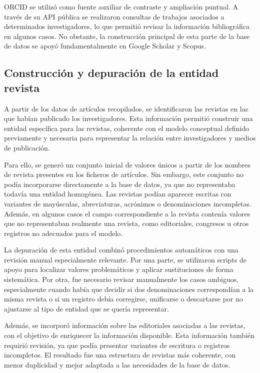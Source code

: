 \documentclass[11pt,spanish,listoffigures,listoftables]{tfgetsinf}
\begin{document}
ORCID se utilizó como fuente auxiliar de contraste y ampliación puntual. A través de su API pública se realizaron consultas de trabajos asociados a determinados investigadores, lo que permitió revisar la información bibliográfica en algunos casos. No obstante, la construcción principal de esta parte de la base de datos se apoyó fundamentalmente en Google Scholar y Scopus.

\subsection{Construcción y depuración de la entidad revista}

A partir de los datos de artículos recopilados, se identificaron las revistas en las que habían publicado los investigadores. Esta información permitió construir una entidad específica para las revistas, coherente con el modelo conceptual definido previamente y necesaria para representar la relación entre investigadores y medios de publicación.

Para ello, se generó un conjunto inicial de valores únicos a partir de los nombres de revista presentes en los ficheros de artículos. Sin embargo, este conjunto no podía incorporarse directamente a la base de datos, ya que no representaba todavía una entidad homogénea. Las revistas podían aparecer escritas con variantes de mayúsculas, abreviaturas, acrónimos o denominaciones incompletas. Además, en algunos casos el campo correspondiente a la revista contenía valores que no representaban realmente una revista, como editoriales, congresos u otros registros no adecuados para el modelo.

La depuración de esta entidad combinó procedimientos automáticos con una revisión manual especialmente relevante. Por una parte, se utilizaron scripts de apoyo para localizar valores problemáticos y aplicar sustituciones de forma sistemática. Por otra, fue necesario revisar manualmente los casos ambiguos, especialmente cuando había que decidir si dos denominaciones correspondían a la misma revista o si un registro debía corregirse, unificarse o descartarse por no ajustarse al tipo de entidad que se quería representar.

Además, se incorporó información sobre las editoriales asociadas a las revistas, con el objetivo de enriquecer la información disponible. Esta información también requirió revisión, ya que podía presentar variantes de escritura o registros incompletos. El resultado fue una estructura de revistas más coherente, con menor duplicidad y mejor adaptada a las necesidades de la base de datos.
\end{document}
